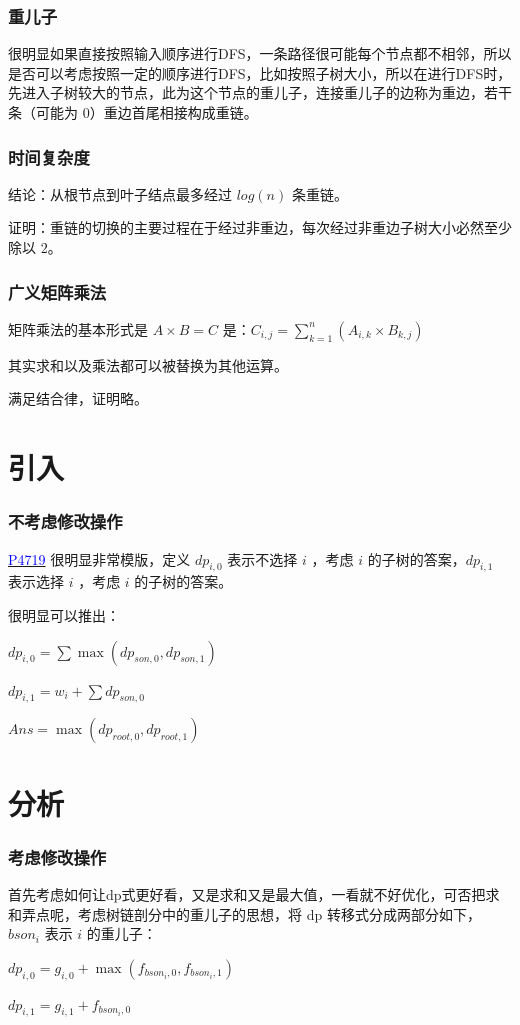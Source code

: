 \documentclass[UTF8]{ctexbeamer}
\begin{document}
	\begin{frame}
		\frametitle{重儿子}
			很明显如果直接按照输入顺序进行DFS，一条路径很可能每个节点都不相邻，所以是否可以考虑按照一定的顺序进行DFS，比如按照子树大小，所以在进行DFS时，先进入子树较大的节点，此为这个节点的重儿子，连接重儿子的边称为重边，若干条（可能为 $0$）重边首尾相接构成重链。
	\end{frame}
	
	\begin{frame}
		\frametitle{时间复杂度}
			结论：从根节点到叶子结点最多经过 $log(n)$ 条重链。	
			
			\hspace*{\fill}
			
			
			\hspace*{\fill}
			
			\hspace*{\fill}
		
			证明：重链的切换的主要过程在于经过非重边，每次经过非重边子树大小必然至少除以 $2$。
	\end{frame}
	
	\begin{frame}
		\frametitle{广义矩阵乘法}
			矩阵乘法的基本形式是 $A \times B=C$ 是：$C_{i,j}=\sum_{k=1}^{n}(A_{i,k}\times B_{k,j})$
			
			其实求和以及乘法都可以被替换为其他运算。
			
			满足结合律，证明略。
	\end{frame}
\section{引入}
	\begin{frame}
		\frametitle{不考虑修改操作}
			\href{https://www.luogu.com.cn/problem/P4719}{\textcolor{blue}{P4719}}
			很明显非常模版，定义 $dp_{i,0}$ 表示不选择 $i$ ，考虑 $i$ 的子树的答案，$dp_{i,1}$ 表示选择 $ i$ ，考虑 $ i$ 的子树的答案。
			
			很明显可以推出：
			
			$dp_{i,0}=\sum \max(dp_{son,0},dp_{son,1})$
			
			$dp_{i,1}= w_i+\sum dp_{son,0}$
			
			$Ans=\max(dp_{root,0},dp_{root,1})$
	\end{frame}
\section{分析}
	\begin{frame}
		\frametitle{考虑修改操作}
		首先考虑如何让dp式更好看，又是求和又是最大值，一看就不好优化，可否把求和弄点呢，考虑树链剖分中的重儿子的思想，将 dp 转移式分成两部分如下，$bson_i$ 表示 $i$ 的重儿子：
		
		$dp_{i,0}=g_{i,0}+\max(f_{bson_i,0},f_{bson_i,1})$
		
		$dp_{i,1}= g_{i,1}+f_{bson_i,0}$
		
	
	\end{frame}
	
\end{document}
